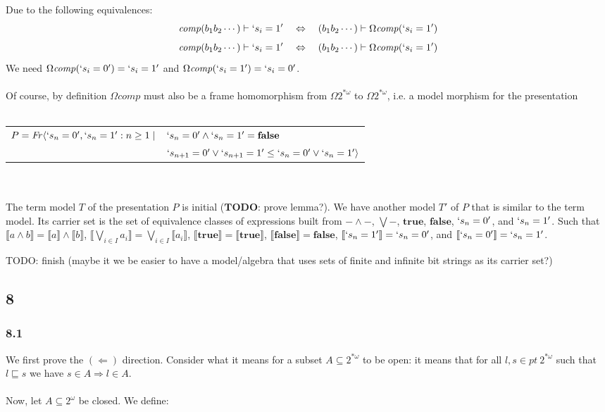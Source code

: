\documentclass{article}
\newcommand{\mbf}{\mathbf}
\newcommand{\sem}[1]{\llbracket #1 \rrbracket}
\begin{document}
\newcommand{\comp}{\mathit{comp}}

Due to the following equivalences:
$$\mathit{comp}(b_1 b_2 \cdots) \vdash `s_i = 1'~~~\Leftrightarrow~~~(b_1 b_2 \cdots) \vdash \Omega \mathit{comp}(`s_i = 1')$$
$$\mathit{comp}(b_1 b_2 \cdots) \vdash `s_i = 1'~~~\Leftrightarrow~~~(b_1 b_2 \cdots) \vdash \Omega \mathit{comp}(`s_i = 1')$$
We need $\Omega \comp(`s_i = 0') = `s_i = 1'$ and $\Omega \comp(`s_i = 1') = `s_i = 0'$.\\~\\
Of course, by definition $\Omega \comp$ must also be a frame homomorphism from $\Omega 2^{*\omega}$ to $\Omega 2^{* \omega}$, i.e. a model morphism for the presentation\\~\\
\begin{tabular}{ll}
$P = \mathit{Fr} \langle `s_n = 0', `s_n = 1' : n \geq 1 \mid$ & $`s_n = 0' \wedge `s_n = 1' = \mbf{false}$ \\
 & $`s_{n+1} = 0' \vee `s_{n+1}=1' \leq `s_n = 0' \vee `s_n = 1' \rangle$\\
\end{tabular}\\~\\
The term model $T$ of the presentation $P$ is initial ($\mbf{TODO}$: prove lemma?). We have another model $T'$ of $P$ that is similar to the term model. Its carrier set is the set of equivalence classes of expressions built from $- \wedge -$, $\bigvee -$, $\mbf{true}$, $\mbf{false}$, $`s_n = 0'$, and $`s_n = 1'$. Such that $\sem{a \wedge b} = \sem{a} \wedge \sem{b}$, $\sem{\bigvee_{i \in I} a_i} = \bigvee_{i \in I} \sem{a_i}$, $\sem{\mbf{true}} = \sem{\mbf{true}}$, $\sem{\mbf{false}} = \mbf{false}$, $\sem{`s_n = 1'} = `s_n = 0'$, and $\sem{`s_n = 0'} = `s_n = 1'$.

TODO: finish (maybe it we be easier to have a model/algebra that uses sets of finite and infinite bit strings as its carrier set?)  

\subsection*{8}

\subsubsection*{8.1}
We first prove the $(\Leftarrow)$ direction. Consider what it means for a subset $A \subseteq 2^{* \omega}$ to be open: it means that for all $l,s \in \mathit{pt}~2^{* \omega}$ such that $l \sqsubseteq s$
we have $s \in A \Rightarrow l \in A$.\\~\\
Now, let $A \subseteq 2^{\omega}$ be closed. We define:\\~\\
\end{document}
